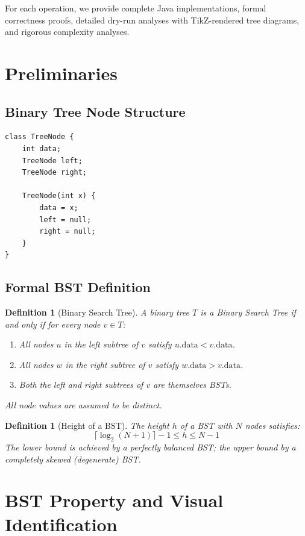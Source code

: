 \documentclass[10pt,journal,compsoc,onecolumn]{IEEEtran}
\newtheorem{definition}[theorem]{Definition}
\begin{document}
For each operation, we provide complete Java implementations, formal correctness proofs, detailed dry-run analyses with TikZ-rendered tree diagrams, and rigorous complexity analyses.

\section{Preliminaries}
\label{sec:prelim}

\subsection{Binary Tree Node Structure}

\begin{verbatim}
class TreeNode {
    int data;
    TreeNode left;
    TreeNode right;

    TreeNode(int x) {
        data = x;
        left = null;
        right = null;
    }
}
\end{verbatim}

\subsection{Formal BST Definition}

\begin{definition}[Binary Search Tree]
A binary tree $T$ is a \emph{Binary Search Tree} if and only if for every node $v \in T$:
\begin{enumerate}
    \item All nodes $u$ in the left subtree of $v$ satisfy $u.\text{data} < v.\text{data}$.
    \item All nodes $w$ in the right subtree of $v$ satisfy $w.\text{data} > v.\text{data}$.
    \item Both the left and right subtrees of $v$ are themselves BSTs.
\end{enumerate}
All node values are assumed to be \emph{distinct}.
\end{definition}

\begin{definition}[Height of a BST]
The \emph{height} $h$ of a BST with $N$ nodes satisfies:
\[
\lceil \log_2(N+1) \rceil - 1 \leq h \leq N - 1
\]
The lower bound is achieved by a perfectly balanced BST; the upper bound by a completely skewed (degenerate) BST.
\end{definition}

\section{BST Property and Visual Identification}
\label{sec:property}
\end{document}
